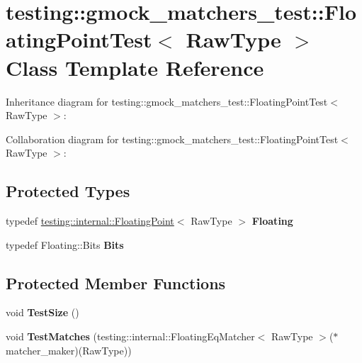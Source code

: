 \hypertarget{classtesting_1_1gmock__matchers__test_1_1FloatingPointTest}{}\section{testing\+:\+:gmock\+\_\+matchers\+\_\+test\+:\+:Floating\+Point\+Test$<$ Raw\+Type $>$ Class Template Reference}
\label{classtesting_1_1gmock__matchers__test_1_1FloatingPointTest}


Inheritance diagram for testing\+:\+:gmock\+\_\+matchers\+\_\+test\+:\+:Floating\+Point\+Test$<$ Raw\+Type $>$\+:


Collaboration diagram for testing\+:\+:gmock\+\_\+matchers\+\_\+test\+:\+:Floating\+Point\+Test$<$ Raw\+Type $>$\+:
\subsection*{Protected Types}
\begin{DoxyCompactItemize}
\item 
\mbox{\label{classtesting_1_1gmock__matchers__test_1_1FloatingPointTest_ae1459f93e1b18426625daf4fa98e80c6}} 
typedef \hyperlink{classtesting_1_1internal_1_1FloatingPoint}{testing\+::internal\+::\+Floating\+Point}$<$ Raw\+Type $>$ {\bfseries Floating}
\item 
\mbox{\label{classtesting_1_1gmock__matchers__test_1_1FloatingPointTest_addf899bd832ae51103198d201d2f2ea2}} 
typedef Floating\+::\+Bits {\bfseries Bits}
\end{DoxyCompactItemize}
\subsection*{Protected Member Functions}
\begin{DoxyCompactItemize}
\item 
\mbox{\label{classtesting_1_1gmock__matchers__test_1_1FloatingPointTest_ad6f8f0f5c939b7447a5717620b728018}} 
void {\bfseries Test\+Size} ()
\item 
\mbox{\label{classtesting_1_1gmock__matchers__test_1_1FloatingPointTest_a69d14d66bbd82f6b8bbe985046b59538}} 
void {\bfseries Test\+Matches} (testing\+::internal\+::\+Floating\+Eq\+Matcher$<$ Raw\+Type $>$($\ast$matcher\+\_\+maker)(Raw\+Type))
\end{DoxyCompactItemize}
